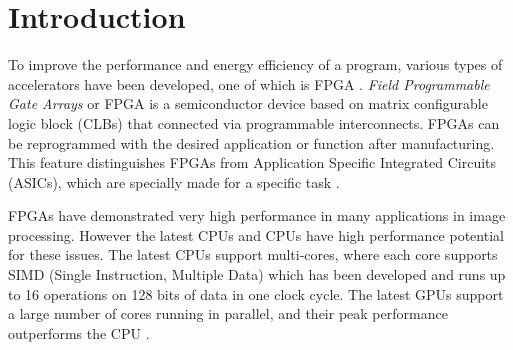 ﻿\section{Introduction}


To improve the performance and energy efficiency of a program, various types of accelerators have been developed, one of which is FPGA \cite{lb:cong}. \textit{Field Programmable Gate Arrays} or FPGA is a semiconductor device based on matrix configurable logic block (CLBs) that connected via programmable interconnects. FPGAs can be reprogrammed with the desired application or function after manufacturing. This feature distinguishes FPGAs from Application Specific Integrated Circuits (ASICs), which are specially made for a specific task \cite{XILINX}.



FPGAs have demonstrated very high performance in many applications in image processing. However the latest CPUs and CPUs have high performance potential for these issues. The latest CPUs support multi-cores, where each core supports SIMD (Single Instruction, Multiple Data) which has been developed and runs up to 16 operations on 128 bits of data in one clock cycle. The latest GPUs support a large number of cores running in parallel, and their peak performance outperforms the CPU \cite{lb:asano}.


